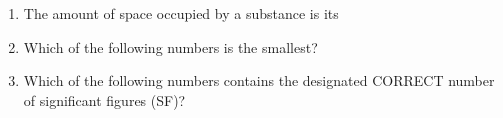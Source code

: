 \documentclass[main.tex]{subfiles}
\begin{document}
\begin{fullwidth}
\begin{multicols*}{2}
\begin{enumerate}
\item  The amount of space occupied by a substance is its 
\begin{enumerate}[label=(\alph*)]\vspace{-0.5cm}
\end{enumerate}
\item  Which of the following numbers is the smallest?
\begin{enumerate}[label=(\alph*)]\vspace{-0.5cm}
\end{enumerate}
\item  Which of the following numbers contains the designated CORRECT number of significant figures (SF)?
\begin{enumerate}[label=(\alph*)]\vspace{-0.25cm}
\end{enumerate}
%





\end{enumerate}
\end{multicols*}
\end{fullwidth}
\end{document}
